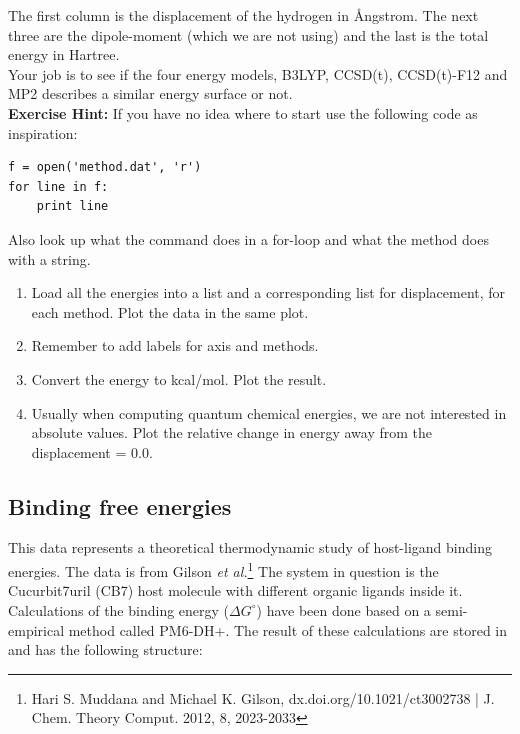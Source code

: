 \documentclass{article}
\begin{document}
The first column is the displacement of the hydrogen in \AA ngstrom. The next three are the dipole-moment (which we are not using) and the last is the total energy in Hartree.\\

Your job is to see if the four energy models, B3LYP, CCSD(t), CCSD(t)-F12 and MP2 describes a similar energy surface or not.\\

{\bf Exercise Hint:}
If you have no idea where to start use the following code as inspiration:

\begin{lstlisting}
f = open('method.dat', 'r')
for line in f:
    print line

\end{lstlisting}

Also look up what the command  does in a for-loop and what the method  does with a string. %

\begin{enumerate}
    \item Load all the energies into a list and a corresponding list for displacement,
          for each method.
          Plot the data in the same plot.

    \item Remember to add labels for axis and methods.

    \item Convert the energy to kcal/mol.
          Plot the result.

    \item Usually when computing quantum chemical energies, we are not interested in absolute values.
          Plot the relative change in energy away from the displacement = 0.0.

\end{enumerate}


\newpage
\subsection{Binding free energies}

This data represents a theoretical thermodynamic study of host-ligand binding energies.
The data is from Gilson {\em et al.}\footnote{Hari S. Muddana and Michael K. Gilson, dx.doi.org/10.1021/ct3002738 | J. Chem. Theory Comput. 2012, 8, 2023-2033}
The system in question is the Cucurbit7uril (CB7) host molecule with different organic ligands inside it.
Calculations of the binding energy ($\Delta G^\circ$) have been done based on a semi-empirical method called PM6-DH+.
The result of these calculations are stored in  and has the following structure:
\end{document}
